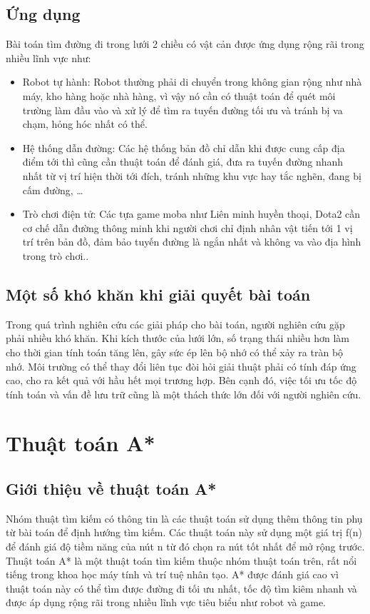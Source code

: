 \documentclass[12pt,a4paper]{report}
\begin{document}
\subsection{Ứng dụng}
Bài toán tìm đường đi trong lưới 2 chiều có vật cản được ứng dụng rộng rãi trong nhiều lĩnh vực như:
    \begin{itemize}
        \item Robot tự hành: Robot thường phải di chuyển trong không gian rộng như nhà máy, kho hàng hoặc nhà hàng, vì vậy nó cần có thuật toán để quét môi trường làm đầu vào và xử lý để tìm ra tuyến đường tối ưu và tránh bị va chạm, hỏng hóc nhất có thể. 
        \item Hệ thống dẫn đường: Các hệ thống bản đồ chỉ dẫn khi được cung cấp địa điểm tới thì cũng cần thuật toán để đánh giá, đưa ra tuyến đường nhanh nhất từ vị trí hiện thời tới đích, tránh những khu vực hay tắc nghẽn, đang bị cấm đường, … 
        \item Trò chơi điện tử: Các tựa game moba như Liên minh huyền thoại, Dota2 cần cơ chế dẫn đường thông minh khi người chơi chỉ định nhân vật tiến tới 1 vị trí trên bản đồ, đảm bảo tuyến đường là ngắn nhất và không va vào địa hình trong trò chơi..
    \end{itemize}
\subsection{Một số khó khăn khi giải quyết bài toán}
Trong quá trình nghiên cứu các giải pháp cho bài toán, người nghiên cứu gặp phải nhiều khó khăn. Khi kích thước của lưới lớn, số trạng thái nhiều hơn làm cho thời gian tính toán tăng lên, gây sức ép lên bộ nhớ có thể xảy ra tràn bộ nhớ. Môi trường có thể thay đổi liên tục đòi hỏi giải thuật phải có tính đáp ứng cao, cho ra kết quả với hầu hết mọi trương hợp. Bên cạnh đó, việc tối ưu tốc độ tính toán và vấn đề lưu trữ cũng là một thách thức lớn đối với người nghiên cứu.

\section{Thuật toán A*}
\subsection{Giới thiệu về thuật toán A*}
Nhóm thuật tìm kiếm có thông tin là các thuật toán sử dụng thêm thông tin phụ từ bài toán để định hướng tìm kiếm. Các thuật toán này sử dụng một giá trị f(n) để đánh giá độ tiềm năng của nút n từ đó chọn ra nút tốt nhất để mở rộng trước. Thuật toán A* là một thuật toán tìm kiếm thuộc nhóm thuật toán trên, rất nổi tiếng trong khoa học máy tính và trí tuệ nhân tạo. A* được đánh giá cao vì thuật toán này có thể tìm được đường đi tối ưu nhất, tốc độ tìm kiêm nhanh và được áp dụng rộng rãi trong nhiều lĩnh vực tiêu biểu như robot và game.
\end{document}
